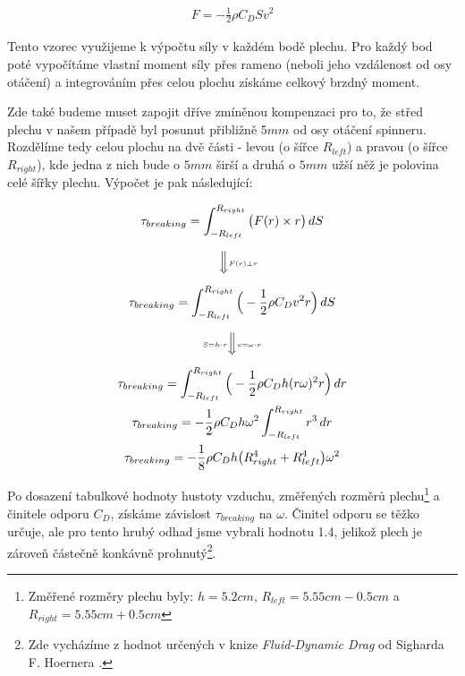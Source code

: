 \begin{equation}
    \label{eq:highschool_drag}
    \begin{gathered}
        F = -\frac{1}{2} \rho C_D S v^2
    \end{gathered}
\end{equation}

\clearpage

Tento vzorec využijeme k výpočtu síly v každém bodě plechu. Pro každý bod poté vypočítáme vlastní moment síly přes rameno (neboli jeho vzdálenost od osy otáčení) a integrováním přes celou plochu získáme celkový brzdný moment.

Zde také budeme muset zapojit dříve zmíněnou kompenzaci pro to, že střed plechu v našem případě byl posunut přibližně $5mm$ od osy otáčení spinneru. Rozdělíme tedy celou plochu na dvě části - levou (o šířce $R_{left}$) a pravou (o šířce $R_{right}$), kde jedna z nich bude o $5mm$ širší a druhá o $5mm$ užší něž je polovina celé šířky plechu. Výpočet je pak následující:

\begin{equation}
    \label{eq:breaking_torque}
    \begin{gathered}
        \tau_{breaking} = \int_{-R_{left}}^{R_{right}} \big( F(r) \times r \big) \,dS \\
        \quad \Big\Downarrow \scriptscriptstyle{F(r) \perp r} \vphantom{\Bigg(} \\
        \tau_{breaking} = \int_{-R_{left}}^{R_{right}} \Big( -\frac{1}{2} \rho C_D v^2 r \Big) \,dS \\
        \scriptscriptstyle{S = h \cdot r} \Big\Downarrow \scriptscriptstyle{v = \omega \cdot r} \vphantom{\Bigg(} \\
        \tau_{breaking} = \int_{-R_{left}}^{R_{right}} \Big( -\frac{1}{2} \rho C_D h (r \omega)^2 r \Big) \,dr \\
        \tau_{breaking} = -\frac{1}{2} \rho C_D h \omega^2 \int_{-R_{left}}^{R_{right}} r^3 \,dr \\
        \tau_{breaking} = -\frac{1}{8} \rho C_D h \big( R_{right}^4 + R_{left}^4 \big) \omega^2
    \end{gathered}
\end{equation}

Po dosazení tabulkové hodnoty hustoty vzduchu, změřených rozměrů plechu\footnote{Změřené rozměry plechu byly: $h = 5.2cm$, $R_{left} = 5.55cm - 0.5cm$ a $R_{right} = 5.55cm + 0.5cm$} a činitele odporu $C_D$, získáme závislost $\tau_{breaking}$ na $\omega$. Činitel odporu se těžko určuje, ale pro tento hrubý odhad jsme vybrali hodnotu 1.4, jelikož plech je zároveň částečně konkávně prohnutý\footnote{Zde vycházíme z hodnot určených v knize \textit{Fluid-Dynamic Drag} od Sigharda F. Hoernera \cite{plate_drag_coef}.}.

